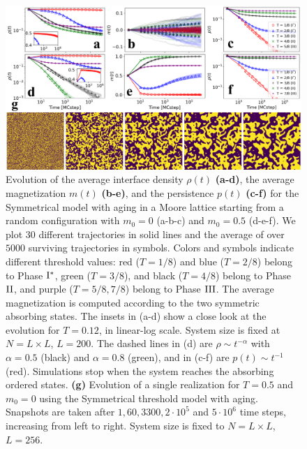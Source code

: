 \begin{figure}[ht]
    \centering \captionsetup{font=sf}
    \includegraphics[width=\linewidth]{Figs/Aging_STM/FIG12_THESIS.pdf}
    \caption[Modified dynamical regimes by aging in a Moore lattice]{\label{fig:evolution_lattice_aging} Evolution of the average interface density $\rho(t)$ \textbf{(a-d)}, the average magnetization $m(t)$ \textbf{(b-e)}, and the persistence $p(t)$ \textbf{(c-f)} for the Symmetrical model with aging in a Moore lattice starting from a random configuration with $m_0 = 0$ (a-b-c) and $m_0 = 0.5$ (d-e-f). We plot 30 different trajectories in solid lines and the average of over $5000$ surviving trajectories in symbols. Colors and symbols indicate different threshold values: red ($T = 1/8$) and blue ($T = 2/8$) belong to Phase ${\rm I}^{*}$, green ($T = 3/8$), and black ($T=4/8$) belong to Phase ${\rm II}$, and purple ($T = 5/8, 7/8$) belong to Phase ${\rm III}$. The average magnetization is computed according to the two symmetric absorbing states. The insets in (a-d) show a close look at the evolution for $T = 0.12$, in linear-log scale. System size is fixed at $N = L \times L$, $L = 200$. The dashed lines in (d) are $\rho \sim t^{-\alpha}$ with $\alpha = 0.5$ (black) and $\alpha = 0.8$ (green), and in (c-f) are $p(t) \sim t^{-1}$ (red). %
    Simulations stop when the system reaches the absorbing ordered states. \textbf{(g)} Evolution of a single realization for $T = 0.5$ and $m_0 = 0$ using the Symmetrical threshold model with aging. Snapshots are taken after $1,60,3300,2 \cdot 10^5$ and $5 \cdot 10^6$ time steps, increasing from left to right. System size is fixed to $N = L \times L$, $L = 256$.}
\end{figure}
